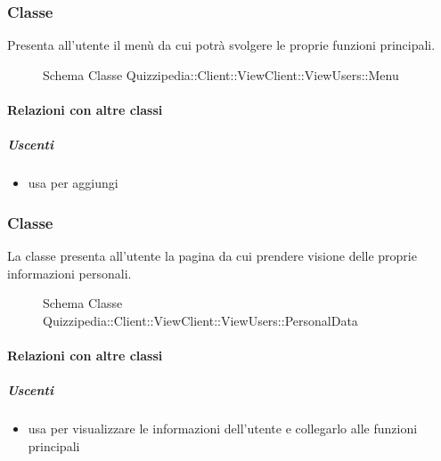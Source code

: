 \subsubsection{Classe }
Presenta all'utente il menù da cui potrà svolgere le proprie funzioni principali.
\begin{figure}[H]
\centering
\noindent{}
\caption[Schema Classe Menu]{Schema Classe Quizzipedia::Client::ViewClient::ViewUsers::Menu}
\end{figure}
\paragraph{Relazioni con altre classi}
\subparagraph{Uscenti}
\begin{itemize}
\item usa  per aggiungi
\end{itemize}
\subsubsection{Classe }
La classe presenta all'utente la pagina da cui prendere visione delle proprie informazioni personali.
\begin{figure}[H]
\centering
\noindent{}
\caption[Schema Classe PersonalData]{Schema Classe Quizzipedia::Client::ViewClient::ViewUsers::PersonalData}
\end{figure}
\paragraph{Relazioni con altre classi}
\subparagraph{Uscenti}
\begin{itemize}
\item usa  per visualizzare le informazioni dell'utente e collegarlo alle funzioni principali
\end{itemize}
